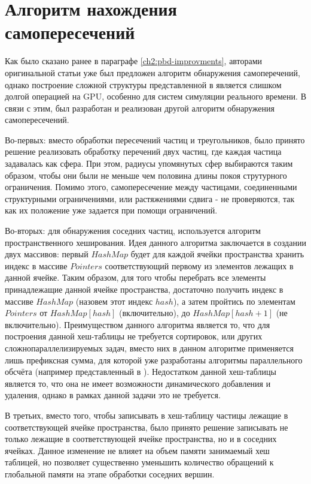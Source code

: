 \section{Алгоритм нахождения самопересечений} \label{ch3:selfCollision}
	Как было сказано ранее в параграфе \ref{ch2:pbd-improvments}, авторами оригинальной статьи уже был предложен алгоритм обнаружения самоперечений, однако построение сложной структуры представленной в \cite{teschner2003optimized} является слишком долгой операцией на GPU, особенно для систем симуляции реального времени. В связи с этим, был разработан и реализован другой алгоритм обнаружения самопересечений.
	
	Во-первых: вместо обработки пересечений частиц и треугольников, было принято решение реализовать обработку перечений двух частиц, где каждая частица задавалась как сфера. При этом, радиусы упомянутых сфер выбираются таким образом, чтобы они были не меньше чем половина длины покоя струтурного ограничения. Помимо этого, самопересечение между частицами, соединенными структурными ограничениями, или растяжениями сдвига - не проверяются, так как их положение уже задается при помощи ограничений.
	
	Во-вторых: для обнаружения соседних частиц, используется алгоритм пространственного хеширования\cite{hashing2023}. Идея данного алгоритма заключается в создании двух массивов: первый $HashMap$ будет для каждой ячейки пространства хранить индекс в массиве $Pointers$ соответствующий первому из элементов лежащих в данной ячейке. Таким образом, для того чтобы перебрать все элементы принадлежащие данной ячейке пространства, достаточно получить индекс в массиве $HashMap$ (назовем этот индекс $hash$), а затем пройтись по элементам $Pointers$ от $HashMap[hash]$ (включительно), до $HashMap[hash + 1]$ (не включительно). Преимуществом данного алгоритма является то, что для построения данной хеш-таблицы не требуется сортировок, или других сложнопараллелизируемых задач, вместо них в данном алгоритме применяется лишь префиксная сумма, для которой уже разработаны алгоритмы параллельного обсчёта (например представленный в \cite{hillis1986data}). Недостатком данной хеш-таблицы является то, что она не имеет возможности динамического добавления и удаления, однако в рамках данной задачи это не требуется.
	
	В третьих, вместо того, чтобы записывать в хеш-таблицу частицы лежащие в соответствующей ячейке пространства, было принято решение записывать не только лежащие в соответствующей ячейке пространства, но и в соседних ячейках. Данное изменение не влияет на объем памяти занимаемый хеш таблицей, но позволяет существенно уменьшить количество обращений к глобальной памяти на этапе обработки соседних вершин.
	
